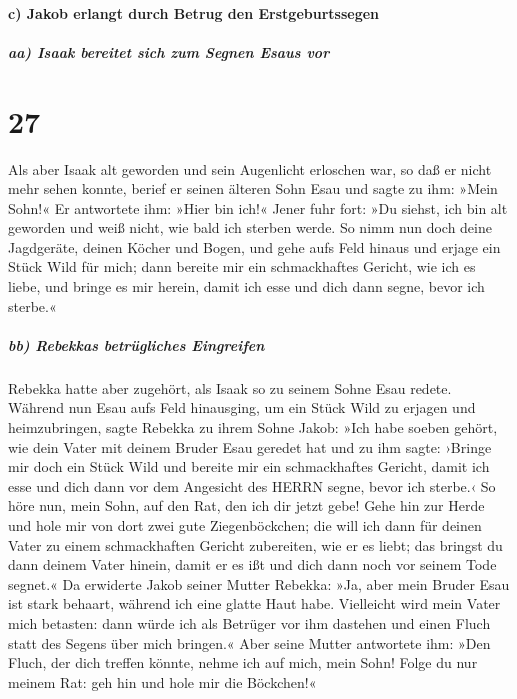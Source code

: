 \hypertarget{c-jakob-erlangt-durch-betrug-den-erstgeburtssegen}{%
\paragraph{c) Jakob erlangt durch Betrug den
Erstgeburtssegen}\label{c-jakob-erlangt-durch-betrug-den-erstgeburtssegen}}

\hypertarget{aa-isaak-bereitet-sich-zum-segnen-esaus-vor}{%
\subparagraph{aa) Isaak bereitet sich zum Segnen Esaus
vor}\label{aa-isaak-bereitet-sich-zum-segnen-esaus-vor}}

\hypertarget{section-26}{%
\section{27}\label{section-26}}

 Als aber Isaak alt geworden und sein Augenlicht erloschen
war, so daß er nicht mehr sehen konnte, berief er seinen älteren Sohn
Esau und sagte zu ihm: »Mein Sohn!« Er antwortete ihm: »Hier bin ich!«
 Jener fuhr fort: »Du siehst, ich bin alt geworden und
weiß nicht, wie bald ich sterben werde.  So nimm nun doch
deine Jagdgeräte, deinen Köcher und Bogen, und gehe aufs Feld hinaus und
erjage ein Stück Wild für mich;  dann bereite mir ein
schmackhaftes Gericht, wie ich es liebe, und bringe es mir herein, damit
ich esse und dich dann segne, bevor ich sterbe.«

\hypertarget{bb-rebekkas-betruxfcgliches-eingreifen}{%
\subparagraph{bb) Rebekkas betrügliches
Eingreifen}\label{bb-rebekkas-betruxfcgliches-eingreifen}}

 Rebekka hatte aber zugehört, als Isaak so zu seinem Sohne
Esau redete. Während nun Esau aufs Feld hinausging, um ein Stück Wild zu
erjagen und heimzubringen,  sagte Rebekka zu ihrem Sohne
Jakob: »Ich habe soeben gehört, wie dein Vater mit deinem Bruder Esau
geredet hat und zu ihm sagte:  ›Bringe mir doch ein Stück
Wild und bereite mir ein schmackhaftes Gericht, damit ich esse und dich
dann vor dem Angesicht des HERRN segne, bevor ich sterbe.‹
 So höre nun, mein Sohn, auf den Rat, den ich dir jetzt
gebe!  Gehe hin zur Herde und hole mir von dort zwei gute
Ziegenböckchen; die will ich dann für deinen Vater zu einem
schmackhaften Gericht zubereiten, wie er es liebt;  das
bringst du dann deinem Vater hinein, damit er es ißt und dich dann noch
vor seinem Tode segnet.«  Da erwiderte Jakob seiner
Mutter Rebekka: »Ja, aber mein Bruder Esau ist stark behaart, während
ich eine glatte Haut habe.  Vielleicht wird mein Vater
mich betasten: dann würde ich als Betrüger vor ihm dastehen und einen
Fluch statt des Segens über mich bringen.«  Aber seine
Mutter antwortete ihm: »Den Fluch, der dich treffen könnte, nehme ich
auf mich, mein Sohn! Folge du nur meinem Rat: geh hin und hole mir die
Böckchen!«

